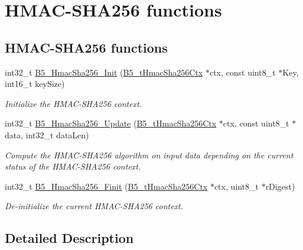 \hypertarget{group__hmacsha_func}{\section{H\-M\-A\-C-\/\-S\-H\-A256 functions}
\label{group__hmacsha_func}
}
\subsection*{H\-M\-A\-C-\/\-S\-H\-A256 functions}
\begin{DoxyCompactItemize}
\item 
int32\-\_\-t \hyperlink{group__hmacsha_func_ga1178a5df067377025aec0bdea3b8f63f}{B5\-\_\-\-Hmac\-Sha256\-\_\-\-Init} (\hyperlink{struct_b5__t_hmac_sha256_ctx}{B5\-\_\-t\-Hmac\-Sha256\-Ctx} $\ast$ctx, const uint8\-\_\-t $\ast$Key, int16\-\_\-t key\-Size)
\begin{DoxyCompactList}\small\item\em Initialize the H\-M\-A\-C-\/\-S\-H\-A256 context. \end{DoxyCompactList}\item 
int32\-\_\-t \hyperlink{group__hmacsha_func_ga4e55de9980f2f0b132d1a5ec343289e0}{B5\-\_\-\-Hmac\-Sha256\-\_\-\-Update} (\hyperlink{struct_b5__t_hmac_sha256_ctx}{B5\-\_\-t\-Hmac\-Sha256\-Ctx} $\ast$ctx, const uint8\-\_\-t $\ast$data, int32\-\_\-t data\-Len)
\begin{DoxyCompactList}\small\item\em Compute the H\-M\-A\-C-\/\-S\-H\-A256 algorithm on input data depending on the current status of the H\-M\-A\-C-\/\-S\-H\-A256 context. \end{DoxyCompactList}\item 
int32\-\_\-t \hyperlink{group__hmacsha_func_gac36fde1fcd954065872e07dadbfccff7}{B5\-\_\-\-Hmac\-Sha256\-\_\-\-Finit} (\hyperlink{struct_b5__t_hmac_sha256_ctx}{B5\-\_\-t\-Hmac\-Sha256\-Ctx} $\ast$ctx, uint8\-\_\-t $\ast$r\-Digest)
\begin{DoxyCompactList}\small\item\em De-\/initialize the current H\-M\-A\-C-\/\-S\-H\-A256 context. \end{DoxyCompactList}\end{DoxyCompactItemize}


\subsection{Detailed Description}


